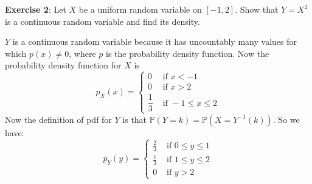 \documentclass{article}
\begin{document}
\textbf{Exercise 2}: Let $X$ be a uniform random variable on $[-1, 2]$. Show that $Y = X^{2}$ is a continuous random variable and find its density.
    \begin{answer}
        $Y$ is a continuous random variable because it has uncountably many values for which $p(x) \neq 0$, where $p$ is the probability density function. Now the probability density function for $X$ is 
            \begin{equation*}
                p_{X}(x) = \begin{cases}
                   0  &\text{ if } x < -1 \\
                    0 &\text{ if } x > 2 \\
                    \dfrac{1}{3} &\text{ if } -1 \leq x \leq 2   
                \end{cases}
            \end{equation*}
        Now the definition of pdf for $Y$ is that $\mathbb{P}(Y = k) = \mathbb{P}(X = Y^{-1}(k))$. So we have:
            \begin{equation*}
                p_{Y}(y) = \begin{cases}
                    \frac{2}{3} &\text{ if } 0 \leq y \leq 1 \\
                    \frac{1}{3} &\text{ if } 1 \leq y \leq 2 \\
                    0 &\text{ if } y > 2   
                \end{cases}
            \end{equation*}
    \end{answer}
\end{document}
